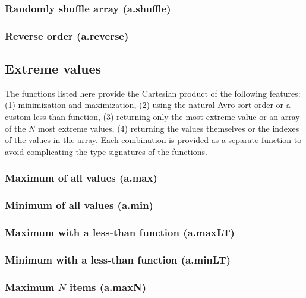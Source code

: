 \documentclass{article}
\theoremstyle{definition}
\begin{document}
\subsubsection{Randomly shuffle array (a.shuffle)}

\subsubsection{Reverse order (a.reverse)}

\subsection{Extreme values}

The functions listed here provide the Cartesian product of the following features: (1) minimization and maximization, (2) using the natural Avro sort order or a custom less-than function, (3) returning only the most extreme value or an array of the $N$ most extreme values, (4) returning the values themselves or the indexes of the values in the array.  Each combination is provided as a separate function to avoid complicating the type signatures of the functions.

\subsubsection{Maximum of all values (a.max)}

\subsubsection{Minimum of all values (a.min)}

\subsubsection{Maximum with a less-than function (a.maxLT)}

\subsubsection{Minimum with a less-than function (a.minLT)}

\subsubsection{Maximum $N$ items (a.maxN)}
\end{document}
